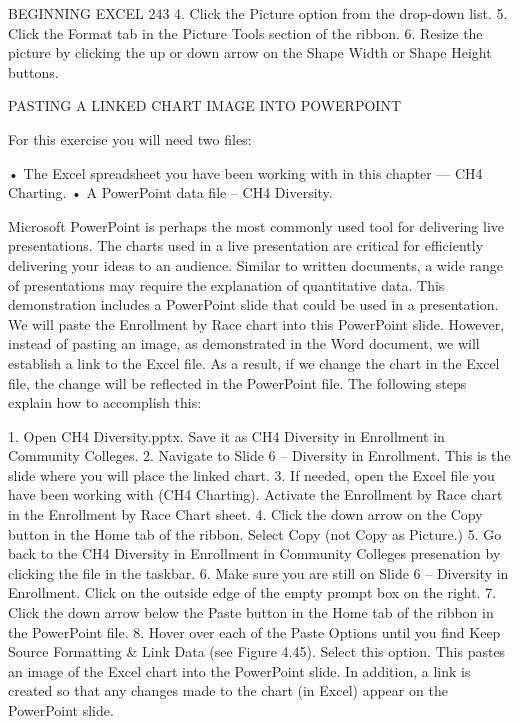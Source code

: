 BEGINNING EXCEL 243
4. Click the Picture option from the drop-down list.
5. Click the Format tab in the Picture Tools section of the ribbon.
6. Resize the picture by clicking the up or down arrow on the Shape Width or Shape Height buttons.



PASTING A LINKED CHART IMAGE INTO POWERPOINT

For this exercise you will need two files:

• The Excel spreadsheet you have been working with in this chapter — CH4 Charting.
• A PowerPoint data file – CH4 Diversity.

Microsoft PowerPoint is perhaps the most commonly used tool for delivering live presentations. The
charts used in a live presentation are critical for efficiently delivering your ideas to an audience.
Similar to written documents, a wide range of presentations may require the explanation of
quantitative data. This demonstration includes a PowerPoint slide that could be used in a
presentation. We will paste the Enrollment by Race chart into this PowerPoint slide. However, instead
of pasting an image, as demonstrated in the Word document, we will establish a link to the Excel file.
As a result, if we change the chart in the Excel file, the change will be reflected in the PowerPoint file.
The following steps explain how to accomplish this:

1. Open CH4 Diversity.pptx. Save it as CH4 Diversity in Enrollment in Community Colleges.
2. Navigate to Slide 6 – Diversity in Enrollment. This is the slide where you will place the linked
chart.
3. If needed, open the Excel file you have been working with (CH4 Charting). Activate the
Enrollment by Race chart in the Enrollment by Race Chart sheet.
4. Click the down arrow on the Copy button in the Home tab of the ribbon. Select Copy (not
Copy as Picture.)
5. Go back to the CH4 Diversity in Enrollment in Community Colleges presenation by clicking the file
in the taskbar.
6. Make sure you are still on Slide 6 – Diversity in Enrollment. Click on the outside edge of the
empty prompt box on the right.
7. Click the down arrow below the Paste button in the Home tab of the ribbon in the PowerPoint
file.
8. Hover over each of the Paste Options until you find Keep Source Formatting & Link Data (see
Figure 4.45). Select this option. This pastes an image of the Excel chart into the PowerPoint
slide. In addition, a link is created so that any changes made to the chart (in Excel) appear on the
PowerPoint slide.




